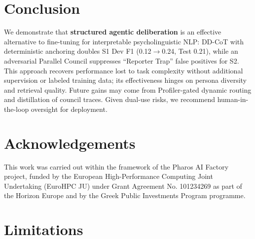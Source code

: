 \documentclass[11pt]{article}
\begin{document}
\section{Conclusion}

We demonstrate that \textbf{structured agentic deliberation} is an effective alternative to fine-tuning for interpretable psycholinguistic NLP: DD-CoT with deterministic anchoring doubles S1 Dev F1 (0.12$\to$0.24, Test 0.21), while an adversarial Parallel Council suppresses ``Reporter Trap'' false positives for S2. This approach recovers performance lost to task complexity without additional supervision or labeled training data; its effectiveness hinges on persona diversity and retrieval quality. Future gains may come from Profiler-gated dynamic routing and distillation of council traces. Given dual-use risks, we recommend human-in-the-loop oversight for deployment.



\section*{Acknowledgements}
This work was carried out within the framework of the Pharos AI Factory project, funded by the European High-Performance Computing Joint Undertaking (EuroHPC JU) under Grant Agreement No. 101234269 as part of the Horizon Europe and by the Greek Public Investments Program programme.

\section*{Limitations}
\end{document}
